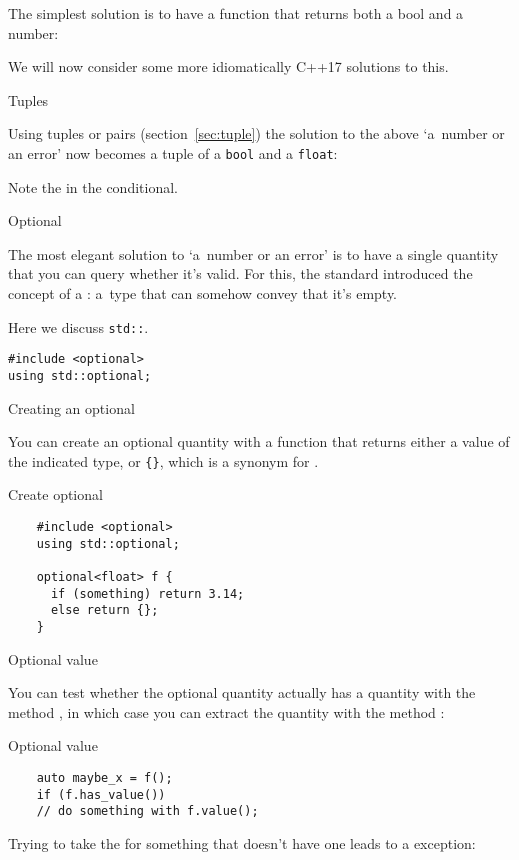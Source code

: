 The simplest solution is to have a function that returns both a bool
and a number:
%

We will now consider some more idiomatically C++17 solutions to this.

 {Tuples}

Using tuples or pairs (section~\ref{sec:tuple}) 
the solution to the above `a~number or an error' now becomes
a tuple of a \lstinline{bool} and a \lstinline{float}:
%

Note the 
in the conditional.

 {Optional}
\label{sec:std-optional}

The most elegant solution to `a~number or an error' is to have a
single quantity that you can query whether it's valid.
For this, the
 standard
introduced the concept of a :
a~type that can somehow convey that it's empty.

Here we discuss \lstinline{std::}.

\begin{lstlisting}
#include <optional>
using std::optional;
\end{lstlisting}

 {Creating an optional}

You can create an optional quantity with a function that returns
either a value of the indicated type, or \verb+{}+, which is a
synonym for .

\begin{block}{Create optional}
  \label{sl:opt-create}
  \begin{lstlisting}
    #include <optional>
    using std::optional;

    optional<float> f {
      if (something) return 3.14;
      else return {};
    }
  \end{lstlisting}
\end{block}

 {Optional value}

You can test whether the optional quantity actually has a quantity with
the method ,
in which case you can extract the quantity
with the method :

\begin{block}{Optional value}
  \label{sl:opt-value}
  \begin{lstlisting}
    auto maybe_x = f();
    if (f.has_value())
    // do something with f.value();
  \end{lstlisting}

  Trying to take the  for something that doesn't have one
  leads to a  exception:
\end{block}


